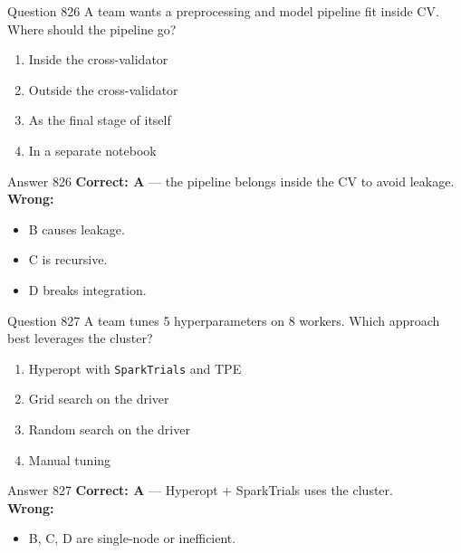 \documentclass[aspectratio=169,11pt]{beamer}
\begin{document}
	\begin{frame}{Question 826}
		A team wants a preprocessing and model pipeline fit inside CV. Where should the pipeline go?
		\begin{enumerate}[label=\Alph*.]
			\item Inside the cross-validator
			\item Outside the cross-validator
			\item As the final stage of itself
			\item In a separate notebook
		\end{enumerate}
	\end{frame}
	\begin{frame}{Answer 826}
		\textbf{Correct: A} --- the pipeline belongs inside the CV to avoid leakage.\\
		\vspace{0.5em}
		\textbf{Wrong:}
		\begin{itemize}
			\item B causes leakage.
			\item C is recursive.
			\item D breaks integration.
		\end{itemize}
	\end{frame}
	
	\begin{frame}{Question 827}
		A team tunes 5 hyperparameters on 8 workers. Which approach best leverages the cluster?
		\begin{enumerate}[label=\Alph*.]
			\item Hyperopt with \texttt{SparkTrials} and TPE
			\item Grid search on the driver
			\item Random search on the driver
			\item Manual tuning
		\end{enumerate}
	\end{frame}
	\begin{frame}{Answer 827}
		\textbf{Correct: A} --- Hyperopt + SparkTrials uses the cluster.\\
		\vspace{0.5em}
		\textbf{Wrong:}
		\begin{itemize}
			\item B, C, D are single-node or inefficient.
		\end{itemize}
	\end{frame}
	
\end{document}
